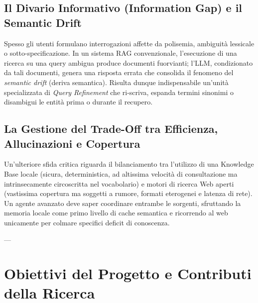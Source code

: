 \subsection{Il Divario Informativo (Information Gap) e il Semantic Drift}
Spesso gli utenti formulano interrogazioni affette da polisemia, ambiguità lessicale o sotto-specificazione. In un sistema RAG convenzionale, l'esecuzione di una ricerca su una query ambigua produce documenti fuorvianti; l'LLM, condizionato da tali documenti, genera una risposta errata che consolida il fenomeno del \textit{semantic drift} (deriva semantica). Risulta dunque indispensabile un'unità specializzata di \textit{Query Refinement} che ri-scriva, espanda termini sinonimi o disambigui le entità prima o durante il recupero.

\subsection{La Gestione del Trade-Off tra Efficienza, Allucinazioni e Copertura}
Un'ulteriore sfida critica riguarda il bilanciamento tra l'utilizzo di una Knowledge Base locale (sicura, deterministica, ad altissima velocità di consultazione ma intrinsecamente circoscritta nel vocabolario) e motori di ricerca Web aperti (vastissima copertura ma soggetti a rumore, formati eterogenei e latenza di rete). Un agente avanzato deve saper coordinare entrambe le sorgenti, sfruttando la memoria locale come primo livello di cache semantica e ricorrendo al web unicamente per colmare specifici deficit di conoscenza.

---

\section{Obiettivi del Progetto e Contributi della Ricerca}
\label{sec:obiettivi_contributi}

